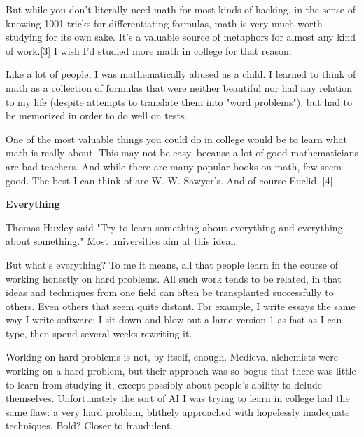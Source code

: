 But while you don't literally need
                    math for most kinds of hacking, in the sense of knowing 1001
                    tricks for differentiating formulas, math is very much worth
                    studying for its own sake. It's a valuable source of
                    metaphors for almost any kind of work.[3] I wish I'd studied
                    more math in college for that reason.

Like a lot
                    of people, I was mathematically abused as a child. I learned
                    to think of math as a collection of formulas that were
                    neither beautiful nor had any relation to my life (despite
                    attempts to translate them into "word problems"), but had to
                    be memorized in order to do well on tests.

One of
                    the most valuable things you could do in college would be to
                    learn what math is really about. This may not be easy,
                    because a lot of good mathematicians are bad teachers. And
                    while there are many popular books on math, few seem good.
                    The best I can think of are W. W. Sawyer's. And of course
                    Euclid. [4]

\textbf{Everything}

Thomas
                    Huxley said "Try to learn something about everything and
                    everything about something." Most universities aim at this
                    ideal.

But what's everything? To me it means, all
                    that people learn in the course of working honestly on hard
                    problems. All such work tends to be related, in that ideas
                    and techniques from one field can often be transplanted
                    successfully to others. Even others that seem quite distant.
                    For example, I write \href{http://www.paulgraham.com/essay.html}{essays} the
                    same way I write software: I sit down and blow out a lame
                    version 1 as fast as I can type, then spend several weeks
                    rewriting it.

Working on hard problems is not, by
                    itself, enough. Medieval alchemists were working on a hard
                    problem, but their approach was so bogus that there was
                    little to learn from studying it, except possibly about
                    people's ability to delude themselves. Unfortunately the
                    sort of AI I was trying to learn in college had the same
                    flaw: a very hard problem, blithely approached with
                    hopelessly inadequate techniques. Bold? Closer to
                    fraudulent.
                    

